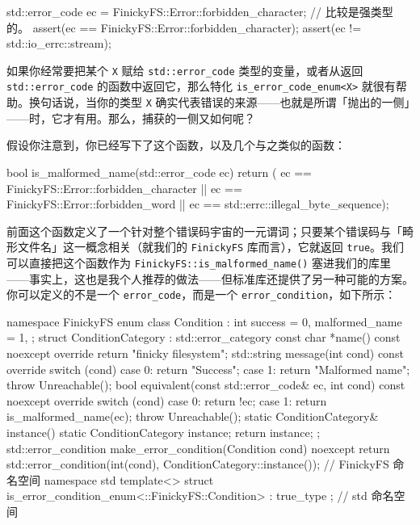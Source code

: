 \begin{codebox}[cpp]
     std::error_code ec = FinickyFS::Error::forbidden_character;
       // 比较是强类型的。
     assert(ec == FinickyFS::Error::forbidden_character);
     assert(ec != std::io_errc::stream);
\end{codebox}

如果你经常要把某个 \texttt{X} 赋给 \texttt{std::\allowbreak{}error\_\allowbreak{}code} 类型的变量，或者从返回 \texttt{std::\allowbreak{}error\_\allowbreak{}code} 的函数中返回它，那么特化 \texttt{is\_\allowbreak{}error\_\allowbreak{}code\_\allowbreak{}enum<\allowbreak{}X>\allowbreak{}} 就很有帮助。换句话说，当你的类型 \texttt{X} 确实代表错误的来源——也就是所谓「抛出的一侧」——时，它才有用。那么，捕获的一侧又如何呢？

假设你注意到，你已经写下了这个函数，以及几个与之类似的函数：

\begin{codebox}[cpp]
     bool is_malformed_name(std::error_code ec) {
       return (
         ec == FinickyFS::Error::forbidden_character ||
         ec == FinickyFS::Error::forbidden_word ||
         ec == std::errc::illegal_byte_sequence);
     }
\end{codebox}

前面这个函数定义了一个针对整个错误码宇宙的一元谓词；只要某个错误码与「畸形文件名」这一概念相关（就我们的 \texttt{Finicky\allowbreak{}FS} 库而言），它就返回 \texttt{true}。我们可以直接把这个函数作为 \texttt{Finicky\allowbreak{}FS::\allowbreak{}is\_\allowbreak{}malformed\_\allowbreak{}name(\allowbreak{})\allowbreak{}} 塞进我们的库里——事实上，这也是我个人推荐的做法——但标准库还提供了另一种可能的方案。你可以定义的不是一个 \texttt{error\_\allowbreak{}code}，而是一个 \texttt{error\_\allowbreak{}condition}，如下所示：

\begin{codebox}[cpp]
     namespace FinickyFS {
     enum class Condition : int {
       success = 0,
       malformed_name = 1,
     };
     struct ConditionCategory : std::error_category {
       const char *name() const noexcept override {
         return "finicky filesystem";
       }
       std::string message(int cond) const override {
         switch (cond) {
           case 0: return "Success";
           case 1: return "Malformed name";
         }
         throw Unreachable();
       }
       bool equivalent(const std::error_code& ec, int cond) const
       noexcept override {
         switch (cond) {
           case 0: return !ec;
           case 1: return is_malformed_name(ec);
         }
         throw Unreachable();
       }
       static ConditionCategory& instance() {
         static ConditionCategory instance;
         return instance;
       }
     };
     std::error_condition make_error_condition(Condition cond) noexcept
     {
       return std::error_condition(int(cond),
       ConditionCategory::instance());
     }
     } // FinickyFS 命名空间
     namespace std {
     template<>
     struct is_error_condition_enum<::FinickyFS::Condition> : true_type
     {};
     } // std 命名空间
\end{codebox}

